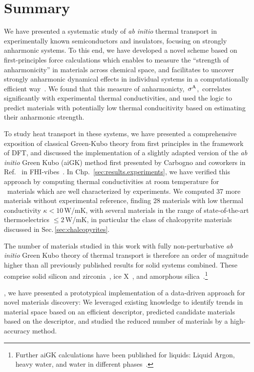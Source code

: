 \section{Summary}

We have presented a systematic study of \emph{ab initio} thermal transport in experimentally known semiconductors and insulators, focusing on strongly anharmonic systems. To this end, we have developed a novel scheme based on first-principles force calculations which enables to measure the ``strength of anharmonicity'' in materials across chemical space, and facilitates to uncover strongly anharmonic dynamical effects in individual systems in a computationally efficient way~\cite{Knoop2020}. We found that this measure of anharmonicty,~$\sigma^\mathrm{A}$,~correlates significantly with experimental thermal conductivities, and used the logic to predict materials with potentially low thermal conducitivity based on estimating their anharmonic strength.

To study heat transport in these systems, we have presented a comprehensive exposition of classical Green-Kubo theory from first principles in the framework of DFT, and discussed the implementation of a slightly adapted version of the \emph{ab initio} Green Kubo (aiGK) method first presented by Carbogno and coworkers in Ref.~\cite{Carbogno2016} in FHI-vibes~\cite{FHI-vibes}. In Chp.~\ref{sec:results.experiments}, we have verified this approach by computing thermal conductivities at room temperature for ~materials which are well characterized by experiments. We computed  37 more materials without experimental reference, finding  28 materials with low thermal conductivity $\kappa < 10$\,W/mK, with several materials in the range of state-of-the-art thermoelectrics $\leq 2$\,W/mK, in particular the class of chalcopyrite materials discussed in Sec.\,\ref{sec:chalcopyrites}.

The number of materials studied in this work with fully non-perturbative \emph{ab initio} Green Kubo theory of thermal transport is therefore an order of magnitude higher than all previously published results for solid systems combined. These comprise solid silicon and zirconia~\cite{Carbogno2016}, ice X~\cite{Grasselli2020}, and amorphous silica~\cite{Marcolongo2020}.\footnote{Further aiGK calculations have been published for liquids: Liquid Argon, heavy water, and water in different phases~\cite{Marcolongo2016,Marcolongo2020,Grasselli2020}.}

, we have presented a prototypical implementation of a data-driven approach for novel materials discovery: We leveraged existing knowledge to identify trends in material space based on an efficient descriptor, predicted candidate materials based on the descriptor, and studied the reduced number of materials by a high-accuracy method.

